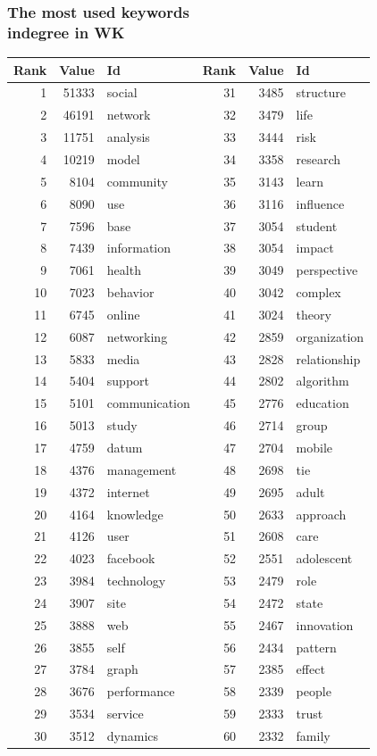 \documentclass[hyperref={pdfstartview={FitBH -32768},
                         pdfpagemode=FullScreen,
                         plainpages=false,
                         colorlinks=true}
              ]{beamer}
\begin{document}
\begin{frame}[fragile]
\frametitle{The most used keywords \\ \normalsize indegree in WK}


\renewcommand{\arraystretch}{0.82}
\tiny
\begin{tabular}{r|r|l||r|r|l}
Rank&  	Value&  	Id&  	Rank&  	Value&  	Id\\ \hline
1&  	51333&  	social&  	31&  	3485&  	structure\\
2&  	46191&  	network&  	32&  	3479&  	life\\
3&  	11751&  	analysis&  	33&  	3444&  	risk\\
4&  	10219&  	model&  	34&  	3358&  	research\\
5&  	8104&  	community&  	35&  	3143&  	learn\\
6&  	8090&  	use&  	36&  	3116&  	influence\\
7&  	7596&  	base&  	37&  	3054&  	student\\
8&  	7439&  	information&  	38&  	3054&  	impact\\
9&  	7061&  	health&  	39&  	3049&  	perspective\\
10&  	7023&  	behavior&  	40&  	3042&  	complex\\
11&  	6745&  	online&  	41&  	3024&  	theory\\
12&  	6087&  	networking&  	42&  	2859&  	organization\\
13&  	5833&  	media&  	43&  	2828&  	relationship\\
14&  	5404&  	support&  	44&  	2802&  	algorithm\\
15&  	5101&  	communication&  	45&  	2776&  	education\\
16&  	5013&  	study&  	46&  	2714&  	group\\
17&  	4759&  	datum&  	47&  	2704&  	mobile\\
18&  	4376&  	management&  	48&  	2698&  	tie\\
19&  	4372&  	internet&  	49&  	2695&  	adult\\
20&  	4164&  	knowledge&  	50&  	2633&  	approach\\
21&  	4126&  	user&  	51&  	2608&  	care\\
22&  	4023&  	facebook&  	52&  	2551&  	adolescent\\
23&  	3984&  	technology&  	53&  	2479&  	role\\
24&  	3907&  	site&  	54&  	2472&  	state\\
25&  	3888&  	web&  	55&  	2467&  	innovation\\
26&  	3855&  	self&  	56&  	2434&  	pattern\\
27&  	3784&  	graph&  	57&  	2385&  	effect\\
28&  	3676&  	performance&  	58&  	2339&  	people\\
29&  	3534&  	service&  	59&  	2333&  	trust\\
30&  	3512&  	dynamics&  	60&  	2332&  	family\\ \hline
\end{tabular}

\end{frame}
\end{document}

